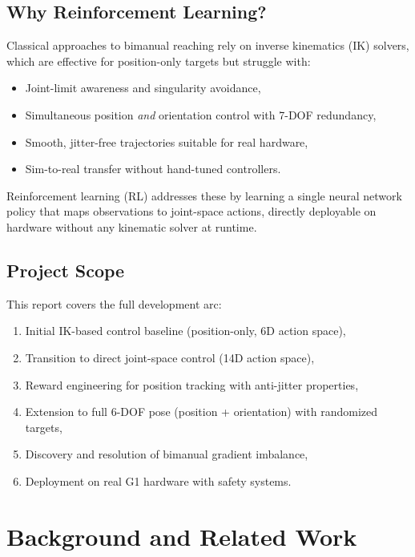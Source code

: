 \documentclass[11pt,a4paper]{article}
\begin{document}
\subsection{Why Reinforcement Learning?}
Classical approaches to bimanual reaching rely on inverse kinematics (IK) solvers, which are effective for position-only targets but struggle with:
\begin{itemize}[nosep]
  \item Joint-limit awareness and singularity avoidance,
  \item Simultaneous position \emph{and} orientation control with 7-DOF redundancy,
  \item Smooth, jitter-free trajectories suitable for real hardware,
  \item Sim-to-real transfer without hand-tuned controllers.
\end{itemize}
Reinforcement learning (RL) addresses these by learning a single neural network policy that maps observations to joint-space actions, directly deployable on hardware without any kinematic solver at runtime.

\subsection{Project Scope}
This report covers the full development arc:
\begin{enumerate}[nosep]
  \item Initial IK-based control baseline (position-only, 6D action space),
  \item Transition to direct joint-space control (14D action space),
  \item Reward engineering for position tracking with anti-jitter properties,
  \item Extension to full 6-DOF pose (position + orientation) with randomized targets,
  \item Discovery and resolution of bimanual gradient imbalance,
  \item Deployment on real G1 hardware with safety systems.
\end{enumerate}

\section{Background and Related Work}
\label{sec:background}
\end{document}
